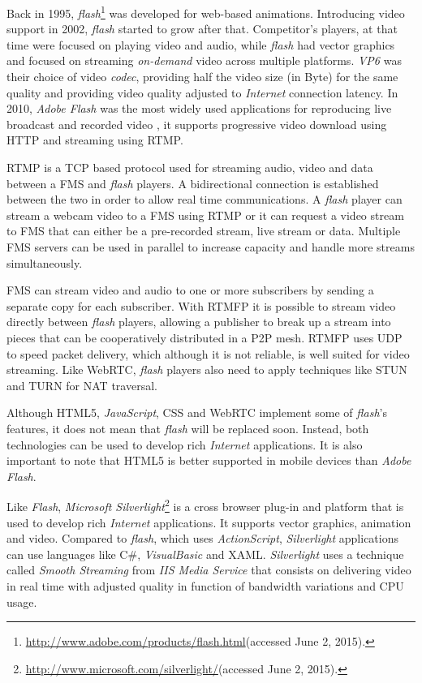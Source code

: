 \documentclass[10pt,conference]{IEEEtran}
\begin{document}
  Back in 1995, \emph{flash}\footnote{\url{http://www.adobe.com/products/flash.html}(accessed June 2, 2015).} was developed for web-based animations. Introducing video support in 2002, \emph{flash} started to grow after that. Competitor's players, at that time were focused on playing video and audio, while \emph{flash} had vector graphics and focused on streaming \emph{on-demand} video across multiple platforms. \emph{VP6} was their choice of video \emph{codec}, providing half the video size (in Byte) for the same quality and providing video quality adjusted to \emph{Internet} connection latency. 
  In 2010, \emph{Adobe Flash} was the most widely used applications for reproducing live broadcast and recorded video \cite{flashvideo}, it supports progressive video download using \gls{HTTP} and streaming using \gls{RTMP}.

  \gls{RTMP} is a \gls{TCP} based protocol used for streaming audio, video and data between a \gls{FMS} and \emph{flash} players. A bidirectional connection is established between the two in order to allow real time communications. A \emph{flash} player can stream a webcam video to a \gls{FMS} using \gls{RTMP} or it can request a video stream to \gls{FMS} that can either be a pre-recorded stream, live stream or data. Multiple \gls{FMS} servers can be used in parallel to increase capacity and handle more streams simultaneously.

  \gls{FMS} can stream video and audio to one or more subscribers by sending a separate copy for each subscriber. With \gls{RTMFP} it is possible to stream video directly between \emph{flash} players, allowing a publisher to break up a stream into pieces that can be cooperatively distributed in a P2P mesh. \gls{RTMFP} uses \gls{UDP} to speed packet delivery, which although it is not reliable, is well suited for video streaming. Like \gls{WebRTC}, \emph{flash} players also need to apply techniques like \gls{STUN} and \gls{TURN} for \gls{NAT} traversal.

  Although \gls{HTML}5, \emph{JavaScript}, \gls{CSS} and \gls{WebRTC} implement some of \emph{flash}'s features, it does not mean that \emph{flash} will be replaced soon.
  Instead, both technologies can be used to develop rich \emph{Internet} applications.
  It is also important to note that \gls{HTML}5 is better supported in mobile devices than \emph{Adobe Flash}. 

  Like \emph{Flash}, \emph{Microsoft Silverlight}\footnote{\url{http://www.microsoft.com/silverlight/}(accessed June 2, 2015).} is a cross browser plug-in and platform that is used to develop rich \emph{Internet} applications. It supports vector graphics, animation and video. Compared to \emph{flash}, which uses \emph{ActionScript}, \emph{Silverlight} applications can use languages like C\#, \emph{VisualBasic} and \gls{XAML}. \emph{Silverlight} uses a technique called \emph{Smooth Streaming} from \emph{IIS Media Service} that consists on delivering video in real time with adjusted quality in function of bandwidth variations and \gls{CPU} usage.
\end{document}
